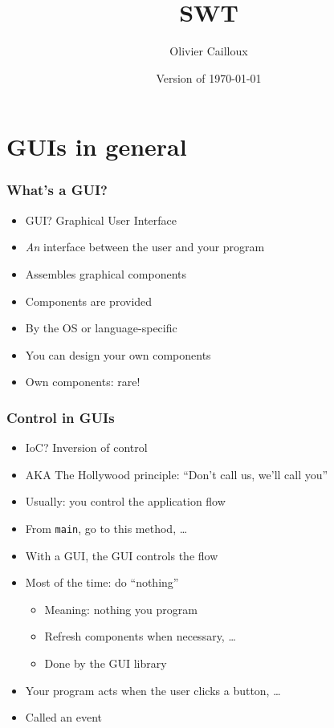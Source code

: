 \documentclass[french, english]{beamer}
\title{SWT}
\subtitle{}
\author{Olivier Cailloux}
\institute[LAMSADE]{LAMSADE, Université Paris-Dauphine}
\date{Version of \today}
\begin{document}


\begin{frame}[plain]
   \titlepage
\end{frame}
\addtocounter{framenumber}{-1}

\section{GUIs in general}
\begin{frame}
	\frametitle{What’s a GUI?}
	\begin{itemize}
		\item GUI? \pause Graphical User Interface
		\item \emph{An} interface between the user and your program
		\item Assembles graphical components
		\item Components are provided
		\item By the OS or language-specific
		\item You can design your own components
		\item Own components: rare!
	\end{itemize}
\end{frame}

\begin{frame}
	\frametitle{Control in GUIs}
	\begin{itemize}
		\item IoC? \pause Inversion of control
		\item AKA The Hollywood principle: “Don’t call us, we’ll call you”
		\item Usually: you control the application flow
		\item From \texttt{main}, go to this method, …
		\item With a GUI, the GUI controls the flow
		\item Most of the time: do “nothing”
		\begin{itemize}
			\item Meaning: nothing you program
			\item Refresh components when necessary, …
			\item Done by the GUI library
		\end{itemize}
		\item Your program acts when the user clicks a button, …
		\item Called an event
	\end{itemize}
\end{frame}
\end{document}

